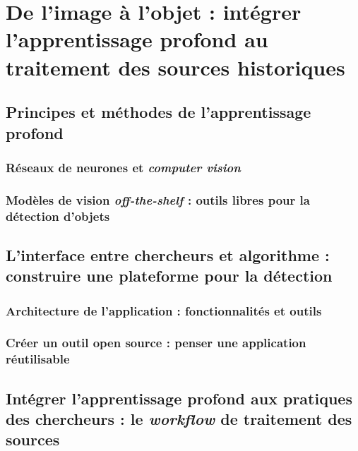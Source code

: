 \documentclass[a4paper,12pt,twoside]{book}
\newcommand{\clearemptydoublepage}{\newpage{\pagestyle{empty}\cleardoublepage}}
\begin{document}
    \part{De l’image à l’objet : intégrer l’apprentissage profond au traitement des sources historiques}
        \chapter[L'apprentissage profond]{Principes et méthodes de l’apprentissage profond}
                \section{Réseaux de neurones et \textit{computer vision}}
                    
            
                \section[Modèles de vision \textit{off-the-shelf}]{Modèles de vision \textit{off-the-shelf} : outils libres pour la détection d’objets}
                    
            
        \clearemptydoublepage
        
        \chapter[L’interface entre chercheurs et algorithme]{L’interface entre chercheurs et algorithme : construire une plateforme pour la détection}
                \section[Architecture de l’application]{Architecture de l’application : fonctionnalités et outils}
                    
                    
                \section{Créer un outil open source : penser une application réutilisable}
            		
            
        \clearemptydoublepage
        
        \chapter[\textit{Deep learning} et pratiques des chercheurs]{Intégrer l’apprentissage profond aux pratiques des chercheurs : le \textit{workflow} de traitement des sources}
\end{document}

